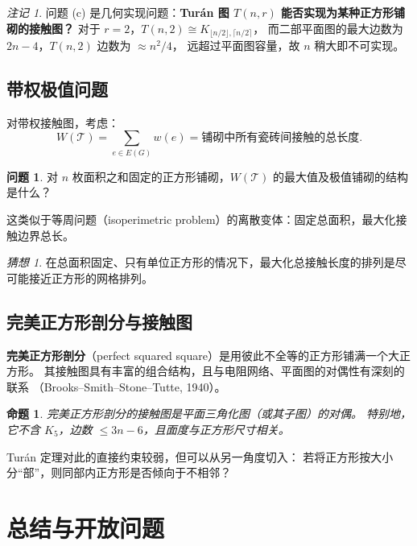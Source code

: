 \documentclass[12pt,a4paper]{article}
\theoremstyle{plain}
\newtheorem{proposition}[theorem]{命题}
\theoremstyle{definition}
\newtheorem{problem}[theorem]{问题}
\theoremstyle{remark}
\newtheorem{remark}[theorem]{注记}
\newtheorem{conjecture}[theorem]{猜想}
\begin{document}
\begin{remark}
问题 (c) 是几何实现问题：\textbf{Turán 图 $T(n,r)$ 能否实现为某种正方形铺砌的接触图？}
对于 $r=2$，$T(n,2) \cong K_{\lfloor n/2\rfloor, \lceil n/2\rceil}$，
而二部平面图的最大边数为 $2n-4$，$T(n,2)$ 边数为 $\approx n^2/4$，
远超过平面图容量，故 $n$ 稍大即不可实现。
\end{remark}

\subsection{带权极值问题}

对带权接触图，考虑：
\[
W(\mathcal{T}) = \sum_{e \in E(G)} w(e) = \text{铺砌中所有瓷砖间接触的总长度}.
\]

\begin{problem}
对 $n$ 枚面积之和固定的正方形铺砌，$W(\mathcal{T})$ 的最大值及极值铺砌的结构是什么？
\end{problem}

这类似于等周问题（isoperimetric problem）的离散变体：固定总面积，最大化接触边界总长。

\begin{conjecture}
在总面积固定、只有单位正方形的情况下，最大化总接触长度的排列是尽可能接近正方形的网格排列。
\end{conjecture}

\subsection{完美正方形剖分与接触图}

\textbf{完美正方形剖分}（perfect squared square）是用彼此不全等的正方形铺满一个大正方形。
其接触图具有丰富的组合结构，且与电阻网络、平面图的对偶性有深刻的联系
（Brooks--Smith--Stone--Tutte, 1940）。

\begin{proposition}
完美正方形剖分的接触图是平面三角化图（或其子图）的对偶。
特别地，它不含 $K_5$，边数 $\le 3n-6$，且面度与正方形尺寸相关。
\end{proposition}

Turán 定理对此的直接约束较弱，但可以从另一角度切入：
若将正方形按大小分``部''，则同部内正方形是否倾向于不相邻？

\section{总结与开放问题}
\end{document}
